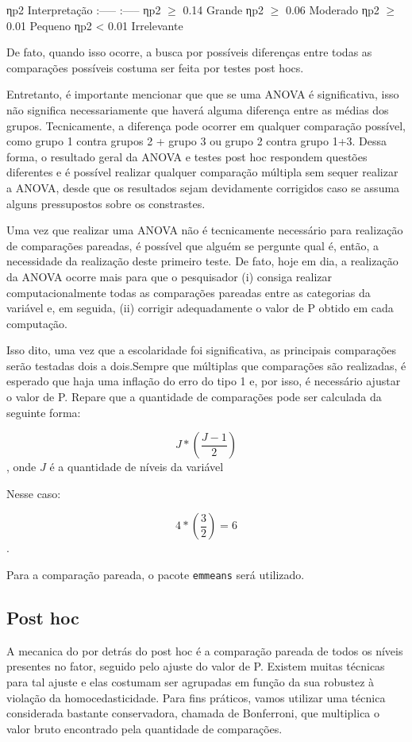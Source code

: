 \documentclass[
]{book}
\begin{document}
ηp2 \textbar{} Interpretação \textbar{} :----- :----- \textbar{} ηp2 \(\geq\) 0.14 \textbar{} Grande \textbar{} ηp2 \(\geq\) 0.06 \textbar{} Moderado \textbar{} ηp2 \(\geq\) 0.01 \textbar{} Pequeno \textbar{} ηp2 \textless{} 0.01 \textbar{} Irrelevante

De fato, quando isso ocorre, a busca por possíveis diferenças entre todas as comparações possíveis costuma ser feita por testes post hocs.

Entretanto, é importante mencionar que que se uma ANOVA é significativa, isso não significa necessariamente que haverá alguma diferença entre as médias dos grupos. Tecnicamente, a diferença pode ocorrer em qualquer comparação possível, como grupo 1 contra grupos 2 + grupo 3 ou grupo 2 contra grupo 1+3. Dessa forma, o resultado geral da ANOVA e testes post hoc respondem questões diferentes e é possível realizar qualquer comparação múltipla sem sequer realizar a ANOVA, desde que os resultados sejam devidamente corrigidos caso se assuma alguns pressupostos sobre os constrastes.

Uma vez que realizar uma ANOVA não é tecnicamente necessário para realização de comparações pareadas, é possível que alguém se pergunte qual é, então, a necessidade da realização deste primeiro teste. De fato, hoje em dia, a realização da ANOVA ocorre mais para que o pesquisador (i) consiga realizar computacionalmente todas as comparações pareadas entre as categorias da variável e, em seguida, (ii) corrigir adequadamente o valor de P obtido em cada computação.

Isso dito, uma vez que a escolaridade foi significativa, as principais comparações serão testadas dois a dois.Sempre que múltiplas que comparações são realizadas, é esperado que haja uma inflação do erro do tipo 1 e, por isso, é necessário ajustar o valor de P. Repare que a quantidade de comparações pode ser calculada da seguinte forma:

\[ J*(\frac{J-1}2) \] , onde
\(J\) é a quantidade de níveis da variável

Nesse caso:

\[ 4*(\frac{3}2) = 6 \].

Para a comparação pareada, o pacote \texttt{emmeans} será utilizado.

\hypertarget{post-hoc}{%
\subsection{Post hoc}\label{post-hoc}}

A mecanica do por detrás do post hoc é a comparação pareada de todos os níveis presentes no fator, seguido pelo ajuste do valor de P. Existem muitas técnicas para tal ajuste e elas costumam ser agrupadas em função da sua robustez à violação da homocedasticidade. Para fins práticos, vamos utilizar uma técnica considerada bastante conservadora, chamada de Bonferroni, que multiplica o valor bruto encontrado pela quantidade de comparações.
\end{document}
